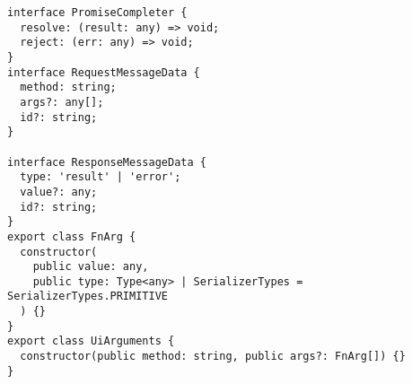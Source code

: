 \begin{verbatim}
interface PromiseCompleter {
  resolve: (result: any) => void;
  reject: (err: any) => void;
}
interface RequestMessageData {
  method: string;
  args?: any[];
  id?: string;
}

interface ResponseMessageData {
  type: 'result' | 'error';
  value?: any;
  id?: string;
}
export class FnArg {
  constructor(
    public value: any,
    public type: Type<any> | SerializerTypes = SerializerTypes.PRIMITIVE
  ) {}
}
export class UiArguments {
  constructor(public method: string, public args?: FnArg[]) {}
}
\end{verbatim}
